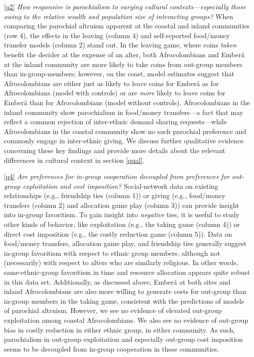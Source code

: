 \documentclass[bibauthoryear]{aa}
\begin{document}
\ref{q2} \emph{How responsive is parochialism to varying cultural contexts---especially those owing to the relative wealth and population size of interacting groups?} When comparing the parochial altruism apparent at the coastal and inland communities (row 4), the effects in the leaving (column 4) and self-reported food/money transfer models (column 2) stand out. In the leaving game, where coins \textit{taken} benefit the decider at the expense of an alter, both Afrocolombians and Ember\'a at the inland community are more likely to take coins from out-group members than in-group-members; however, on the coast, model estimates suggest that Afrocolombians are either just as likely to leave coins for Ember\'a  as for Afrocolombians (model with controls) or are \textit{more} likely to leave coins for Ember\'a than for Afrocolombians (model without controls).  Afrocolombians in the inland community show parochialism in food/money transfers---a fact that may reflect a common \citep[although not universal,][]{Cay73} rejection of inter-ethnic demand sharing requests---while Afrocolombians in the coastal community show no such parochial preference and commonly engage in inter-ethnic giving.  We discuss further qualitative evidence concerning these key findings and provide more details about the relevant differences in cultural context in section \ref{qual}. 

\ref{q4} \emph{Are preferences for in-group cooperation decoupled from preferences for out-group exploitation and cost imposition?} Social-network data on existing relationships (e.g., friendship ties (column 1)) or giving (e.g., food/money transfers (column 2) and allocation game play (column 3)) can provide insight into in-group favoritism. To gain insight into \emph{negative} ties, it is useful to study other kinds of behavior, like exploitation (e.g., the taking game (column 4)) or direct cost imposition (e.g., the costly reduction game (column 5)). Data on food/money transfers, allocation game play, and friendship ties generally suggest in-group favoritism with respect to ethnic group members, although not (necessarily) with respect to alters who are similarly religious. In other words, same-ethnic-group favoritism in time and resource allocation appears quite robust in this data set. Additionally, as discussed above, Ember\'a at both sites and inland Afrocolombians are also more willing to generate costs for out-group than in-group members in the taking game, consistent with the predictions of models of parochial altruism.  However, we see no evidence of elevated out-group exploitation among coastal Afrocolombians. We also see no evidence of out-group bias in costly reduction in either ethnic group, in either community. As such, parochialism in out-group exploitation and especially out-group cost imposition seems to  be decoupled from in-group cooperation in these communities.
\end{document}
